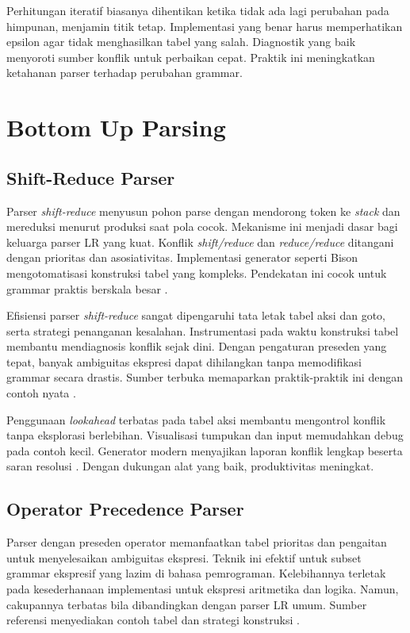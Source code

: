 \documentclass[../main.tex]{subfiles}
\begin{document}
Perhitungan iteratif biasanya dihentikan ketika tidak ada lagi perubahan pada himpunan, menjamin titik tetap. Implementasi yang benar harus memperhatikan epsilon agar tidak menghasilkan tabel yang salah. Diagnostik yang baik menyoroti sumber konflik untuk perbaikan cepat. Praktik ini meningkatkan ketahanan parser terhadap perubahan grammar.

\section{Bottom Up Parsing}
\subsection{Shift-Reduce Parser}
Parser \emph{shift-reduce} menyusun pohon parse dengan mendorong token ke \emph{stack} dan mereduksi menurut produksi saat pola cocok. Mekanisme ini menjadi dasar bagi keluarga parser LR yang kuat. Konflik \emph{shift/reduce} dan \emph{reduce/reduce} ditangani dengan prioritas dan asosiativitas. Implementasi generator seperti Bison mengotomatisasi konstruksi tabel yang kompleks. Pendekatan ini cocok untuk grammar praktis berskala besar \citep{WikiShiftReduce,BisonManual}.

Efisiensi parser \emph{shift-reduce} sangat dipengaruhi tata letak tabel aksi dan goto, serta strategi penanganan kesalahan. Instrumentasi pada waktu konstruksi tabel membantu mendiagnosis konflik sejak dini. Dengan pengaturan preseden yang tepat, banyak ambiguitas ekspresi dapat dihilangkan tanpa memodifikasi grammar secara drastis. Sumber terbuka memaparkan praktik-praktik ini dengan contoh nyata \citep{BisonManual}.

Penggunaan \emph{lookahead} terbatas pada tabel aksi membantu mengontrol konflik tanpa eksplorasi berlebihan. Visualisasi tumpukan dan input memudahkan debug pada contoh kecil. Generator modern menyajikan laporan konflik lengkap beserta saran resolusi \citep{BisonManual}. Dengan dukungan alat yang baik, produktivitas meningkat.

\subsection{Operator Precedence Parser}
Parser dengan preseden operator memanfaatkan tabel prioritas dan pengaitan untuk menyelesaikan ambiguitas ekspresi. Teknik ini efektif untuk subset grammar ekspresif yang lazim di bahasa pemrograman. Kelebihannya terletak pada kesederhanaan implementasi untuk ekspresi aritmetika dan logika. Namun, cakupannya terbatas bila dibandingkan dengan parser LR umum. Sumber referensi menyediakan contoh tabel dan strategi konstruksi \citep{WikiOperatorPrecedence}.
\end{document}
